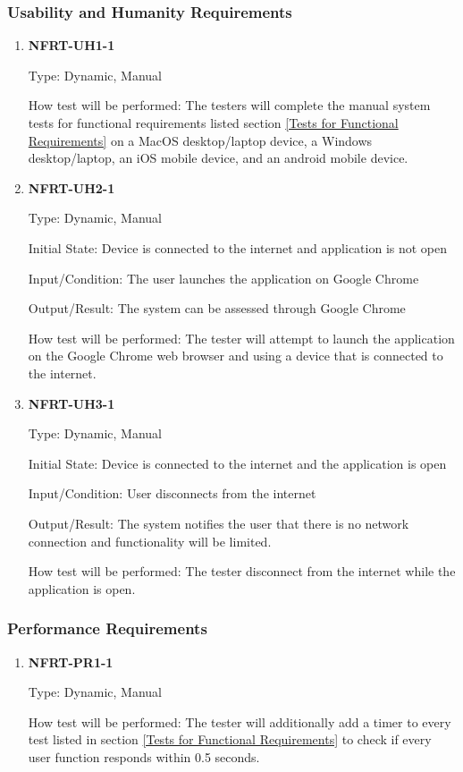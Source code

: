 \documentclass[12pt, titlepage]{article}
\begin{document}
\subsubsection{Usability and Humanity Requirements}
\begin{enumerate}

	\item \textbf{NFRT-UH1-1} %

	      Type: Dynamic, Manual

	      How test will be performed: The testers will complete the manual system tests for functional
	      requirements listed section \ref{Tests for Functional Requirements} on a MacOS desktop/laptop
	      device, a Windows desktop/laptop, an iOS mobile device, and an android mobile device.

	\item \textbf{NFRT-UH2-1} %

	      Type: Dynamic, Manual

	      Initial State: Device is connected to the internet and application is not open

	      Input/Condition: The user launches the application on Google Chrome

	      Output/Result: The system can be assessed through Google Chrome

	      How test will be performed: The tester will attempt to launch the application on the Google Chrome
	      web browser and using a device that is connected to the internet.

	\item \textbf{NFRT-UH3-1} %

	      Type: Dynamic, Manual

	      Initial State: Device is connected to the internet and the application is open

	      Input/Condition: User disconnects from the internet

	      Output/Result: The system notifies the user that there is no network connection and functionality
	      will be limited.

	      How test will be performed: The tester disconnect from the internet while the application is open.

\end{enumerate}

\subsubsection{Performance Requirements}
\begin{enumerate}
	\item \textbf{NFRT-PR1-1} %

	      Type: Dynamic, Manual

	      How test will be performed: The tester will additionally add a timer to every test listed in
	      section \ref{Tests for Functional Requirements} to check if every user function responds within 0.5
	      seconds.

\end{enumerate}
\end{document}

